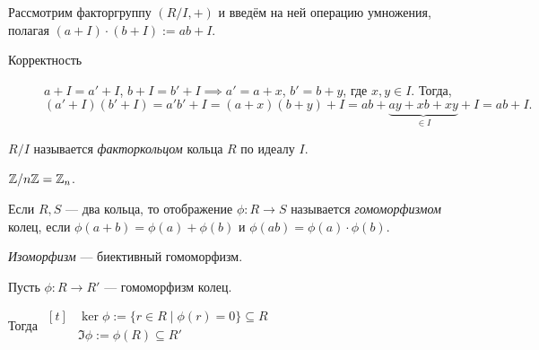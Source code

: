 \bigskip
Рассмотрим факторгруппу $(R/I, +)$ и введём на ней операцию умножения, полагая $(a + I) \cdot (b + I) := ab + I$.

\begin{description}
\item[Корректность] $a + I = a' + I$, $b + I = b' + I \implies a' = a + x$, $b' = b + y$, где $x, y \in I$. Тогда, 
    \begin{equation*}
        (a' + I)(b' + I) = a' b' + I = (a + x) (b + y) + I = ab + \underbrace{ay + xb + xy}_{\in I} + I = ab + I
    .\end{equation*}
\end{description}

\begin{comment}
    $R/I$ --- кольцо.
\end{comment}


\begin{definition}
    $R/I$ называется \textit{факторкольцом} кольца $R$ по идеалу $I$.
\end{definition}

\begin{example}
    $\mathbb{Z} / n \mathbb{Z} = \mathbb{Z}_n$.
\end{example}

\begin{definition}
    Если $R, S$ --- два кольца, то отображение $\phi \colon R \to S$ называется \textit{гомоморфизмом} колец, если $\phi(a + b) = \phi(a) + \phi(b)$ и $\phi(ab) = \phi(a) \cdot \phi(b)$.
\end{definition}

\textit{Изоморфизм} --- биективный гомоморфизм.

\bigskip
Пусть $\phi \colon R \to R'$ --- гомоморфизм колец.

Тогда 
\begin{math}
    \begin{aligned}[t]
        &\ker \phi := \{r \in R \mid \phi (r) = 0\} \subseteq R \\
        &\Im \phi := \phi(R) \subseteq R'
    \end{aligned}
\end{math}

\begin{comment}~
    \begin{enumerate}[nosep]
    \item $\ker \phi \lhd R$;
    \item $\Im \phi$ --- подкольцо в $R'$.
    \end{enumerate}
\end{comment}

